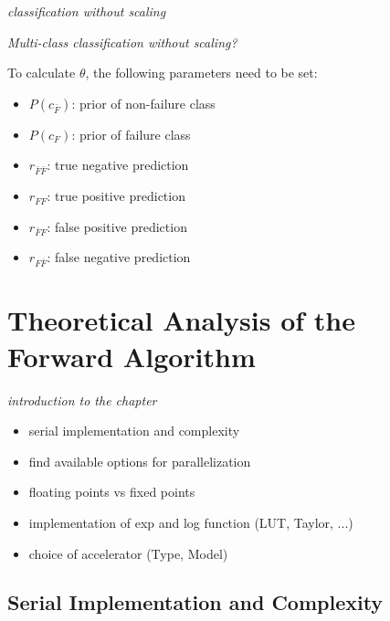 \documentclass[mscthesis]{usiinfthesis}
\begin{document}
\emph{\color{red}classification without scaling}

\emph{\color{red}Multi-class classification without scaling?}

To calculate $ \theta $, the following parameters need to be set:
\begin{itemize}
    \item $ P(c_{\bar{F}}) $: prior of non-failure class
    \item $ P(c_F) $: prior of failure class
    \item $ r_{\bar{F}\bar{F}} $: true negative prediction
    \item $ r_{FF} $: true positive prediction
    \item $ r_{\bar{F}F} $: false positive prediction
    \item $ r_{F\bar{F}} $: false negative prediction
\end{itemize}

\chapter{Theoretical Analysis of the Forward Algorithm}
\label{ch:analysis}

\emph{\color{red}introduction to the chapter}
\begin{itemize}
    \item serial implementation and complexity
    \item find available options for parallelization
    \item floating points vs fixed points
    \item implementation of exp and log function (LUT, Taylor, ...)
    \item choice of accelerator (Type, Model)
\end{itemize}

\section{Serial Implementation and Complexity}
\label{ch:analysis_serial}
\end{document}
